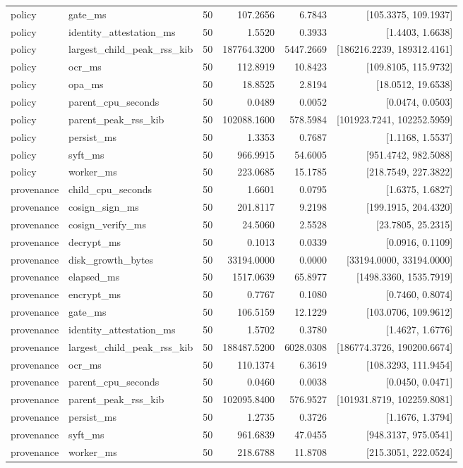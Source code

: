 \begin{tabular}{llrrrr}
policy & gate\_ms & 50 & 107.2656 & 6.7843 & [105.3375, 109.1937] \\
policy & identity\_attestation\_ms & 50 & 1.5520 & 0.3933 & [1.4403, 1.6638] \\
policy & largest\_child\_peak\_rss\_kib & 50 & 187764.3200 & 5447.2669 & [186216.2239, 189312.4161] \\
policy & ocr\_ms & 50 & 112.8919 & 10.8423 & [109.8105, 115.9732] \\
policy & opa\_ms & 50 & 18.8525 & 2.8194 & [18.0512, 19.6538] \\
policy & parent\_cpu\_seconds & 50 & 0.0489 & 0.0052 & [0.0474, 0.0503] \\
policy & parent\_peak\_rss\_kib & 50 & 102088.1600 & 578.5984 & [101923.7241, 102252.5959] \\
policy & persist\_ms & 50 & 1.3353 & 0.7687 & [1.1168, 1.5537] \\
policy & syft\_ms & 50 & 966.9915 & 54.6005 & [951.4742, 982.5088] \\
policy & worker\_ms & 50 & 223.0685 & 15.1785 & [218.7549, 227.3822] \\
provenance & child\_cpu\_seconds & 50 & 1.6601 & 0.0795 & [1.6375, 1.6827] \\
provenance & cosign\_sign\_ms & 50 & 201.8117 & 9.2198 & [199.1915, 204.4320] \\
provenance & cosign\_verify\_ms & 50 & 24.5060 & 2.5528 & [23.7805, 25.2315] \\
provenance & decrypt\_ms & 50 & 0.1013 & 0.0339 & [0.0916, 0.1109] \\
provenance & disk\_growth\_bytes & 50 & 33194.0000 & 0.0000 & [33194.0000, 33194.0000] \\
provenance & elapsed\_ms & 50 & 1517.0639 & 65.8977 & [1498.3360, 1535.7919] \\
provenance & encrypt\_ms & 50 & 0.7767 & 0.1080 & [0.7460, 0.8074] \\
provenance & gate\_ms & 50 & 106.5159 & 12.1229 & [103.0706, 109.9612] \\
provenance & identity\_attestation\_ms & 50 & 1.5702 & 0.3780 & [1.4627, 1.6776] \\
provenance & largest\_child\_peak\_rss\_kib & 50 & 188487.5200 & 6028.0308 & [186774.3726, 190200.6674] \\
provenance & ocr\_ms & 50 & 110.1374 & 6.3619 & [108.3293, 111.9454] \\
provenance & parent\_cpu\_seconds & 50 & 0.0460 & 0.0038 & [0.0450, 0.0471] \\
provenance & parent\_peak\_rss\_kib & 50 & 102095.8400 & 576.9527 & [101931.8719, 102259.8081] \\
provenance & persist\_ms & 50 & 1.2735 & 0.3726 & [1.1676, 1.3794] \\
provenance & syft\_ms & 50 & 961.6839 & 47.0455 & [948.3137, 975.0541] \\
provenance & worker\_ms & 50 & 218.6788 & 11.8708 & [215.3051, 222.0524] \\
\end{tabular}
